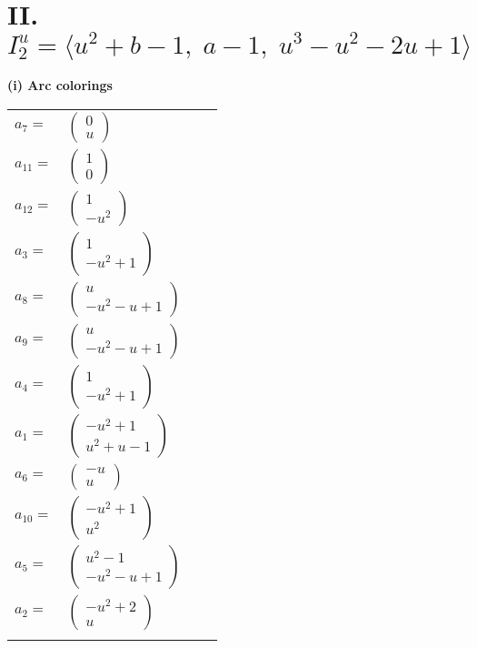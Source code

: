 \documentclass[1p]{elsarticle_modified}
\theoremstyle{definition}
\begin{document}
\centering \section*{II. $I^u_{2}= \langle u^2+b-1,\;a-1,\;u^3- u^2-2 u+1 \rangle$}
\flushleft \textbf{(i) Arc colorings}\\
\begin{tabular}{m{7pt} m{180pt} m{7pt} m{180pt} }
\flushright $a_{7}=$&$\begin{pmatrix}0\\u\end{pmatrix}$ \\
\flushright $a_{11}=$&$\begin{pmatrix}1\\0\end{pmatrix}$ \\
\flushright $a_{12}=$&$\begin{pmatrix}1\\- u^2\end{pmatrix}$ \\
\flushright $a_{3}=$&$\begin{pmatrix}1\\- u^2+1\end{pmatrix}$ \\
\flushright $a_{8}=$&$\begin{pmatrix}u\\- u^2- u+1\end{pmatrix}$ \\
\flushright $a_{9}=$&$\begin{pmatrix}u\\- u^2- u+1\end{pmatrix}$ \\
\flushright $a_{4}=$&$\begin{pmatrix}1\\- u^2+1\end{pmatrix}$ \\
\flushright $a_{1}=$&$\begin{pmatrix}- u^2+1\\u^2+u-1\end{pmatrix}$ \\
\flushright $a_{6}=$&$\begin{pmatrix}- u\\u\end{pmatrix}$ \\
\flushright $a_{10}=$&$\begin{pmatrix}- u^2+1\\u^2\end{pmatrix}$ \\
\flushright $a_{5}=$&$\begin{pmatrix}u^2-1\\- u^2- u+1\end{pmatrix}$ \\
\flushright $a_{2}=$&$\begin{pmatrix}- u^2+2\\u\end{pmatrix}$\\&\end{tabular}
\end{document}
